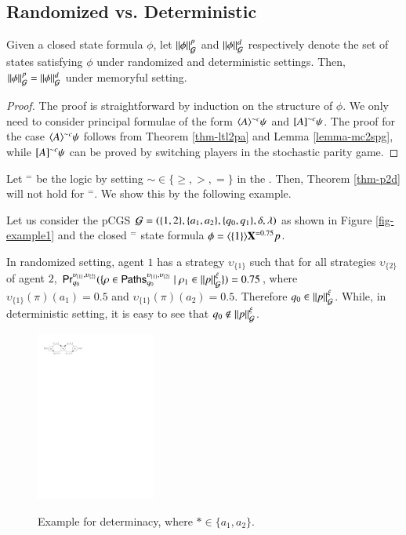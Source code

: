 \subsection{Randomized vs. Deterministic}
\begin{theorem}\label{thm-p2d}
Given a closed \pamc state formula $\phi$, let $\|{\phi}\|_{\mathcal{G}}^p$ and $\|{\phi}\|_{\mathcal{G}}^d$ respectively denote the set of states
satisfying $\phi$ under randomized and deterministic settings. Then,
$\|{\phi}\|_{\mathcal{G}}^p=\|{\phi}\|_{\mathcal{G}}^d$ under memoryful setting.
\end{theorem}
\begin{proof}
The proof is straightforward by induction on the structure of $\phi$.
We only need to consider principal formulae of the form $\langle{A}\rangle^{\sim c}\psi$ and $[{A}]^{\sim c}\psi$.
The proof for the case $\langle{A}\rangle^{\sim c}\psi$ follows from
Theorem \ref{thm-ltl2pa} and Lemma \ref{lemma-mc2spg}, while $[{A}]^{\sim c}\psi$
can be proved by switching players in the stochastic parity game.
\end{proof}

Let \pamc$^=$ be the logic by setting $\sim\in\{\geq,>,=\}$ in the \pamc.
Then, Theorem \ref{thm-p2d} will not hold for \pamc$^=$. We show this by the following example.




\begin{example}
Let us consider the pCGS
$\mathcal{G}=(\{1,2\},\{a_1,a_2\},\{q_0,q_1\}, \delta,\lambda)$ as shown in Figure \ref{fig-example1} and the closed \pamc$^=$ state formula $\phi=\langle{\{1\}}\rangle{\bf X}^{=0.75} p$.

In randomized setting, agent $1$ has a strategy $\upsilon_{\{1\}}$ such that for all strategies $\upsilon_{\{2\}}$ of agent $2$, $\textsf{Pr}_{q_0}^{\upsilon_{\{1\}},\upsilon_{\{2\}}}(\{\rho\in {\sf Paths}_{q_0}^{\upsilon_{\{1\}}, \upsilon_{\{2\}}}\mid \rho_1\in\|{p}\|_{\mathcal{G}}^\xi\})=0.75$, where
$\upsilon_{\{1\}}(\pi)(a_1)=0.5$ and $\upsilon_{\{1\}}(\pi)(a_2)=0.5$. Therefore $q_0\in\|{p}\|_{\mathcal{G}}^\xi$.
While, in deterministic setting, it is easy to see that $q_0\not\in\|{p}\|_{\mathcal{G}}^\xi$.
\end{example}



\begin{figure}[h]
  \centering
  \includegraphics[width=0.35\textwidth]{figure//fig-example2}\\
  \caption{Example for determinacy, where $*\in\{a_1,a_2\}$.}\label{fig-example2}
\end{figure}


